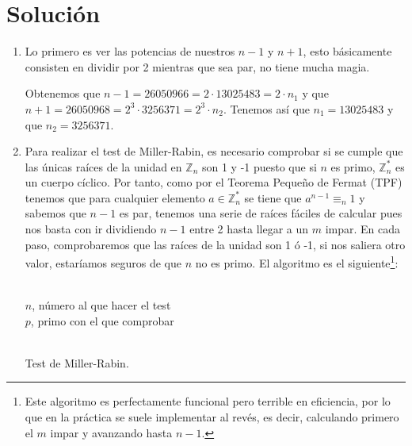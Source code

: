 \section*{Solución}
	\begin{enumerate}
		\item Lo primero es ver las potencias de nuestros $n-1$ y $n+1$, esto básicamente consisten en dividir
		por 2 mientras que sea par, no tiene mucha magia.
		
		Obtenemos que $n-1 = 26050966 = 2 \cdot 13025483 = 2 \cdot n_1$ y que $n+1 = 26050968 = 2^3 \cdot 3256371
		= 2^3 \cdot n_2$. Tenemos así que $n_1 = 13025483$ y que $n_2 = 3256371$.
		
		\item Para realizar el test de Miller-Rabin, es necesario comprobar si se cumple que las únicas raíces de
		la unidad en $\mathbb{Z}_n$ son 1 y -1 puesto que si $n$ es primo, $\mathbb{Z}^*_n$ es un cuerpo cíclico.
		Por tanto, como por el Teorema Pequeño de Fermat (TPF) tenemos que para cualquier elemento $a \in
		\mathbb{Z}^*_n$ se tiene que $a^{n-1} \equiv_n 1$ y sabemos que $n-1$ es par, tenemos una serie de raíces
		fáciles de calcular pues nos basta con ir dividiendo $n-1$ entre 2 hasta llegar a un $m$ impar. En cada
		paso, comprobaremos que las raíces de la unidad son 1 ó -1, si nos saliera otro valor, estaríamos seguros
		de que $n$ no es primo. El algoritmo es el siguiente\footnote{Este algoritmo es perfectamente funcional
		pero terrible en eficiencia, por lo que en la práctica se suele implementar al revés, es decir, calculando
		primero el $m$ impar y avanzando hasta $n-1$.}:
		
		\begin{algorithm}[H]
		\begin{algorithmic}[1]
			\REQUIRE \ \\
				\texttt{$n$}, número al que hacer el test \\
				\texttt{$p$}, primo con el que comprobar \\ \
			\ELSE
					\ENDIF
				\ENDWHILE
					\ELSE
					\ENDIF
				\ENDIF
			\ENDIF
		\end{algorithmic}
		\caption{Test de Miller-Rabin.}
		\label{Miller-Rabin}
		\end{algorithm}
		

\end{enumerate}
